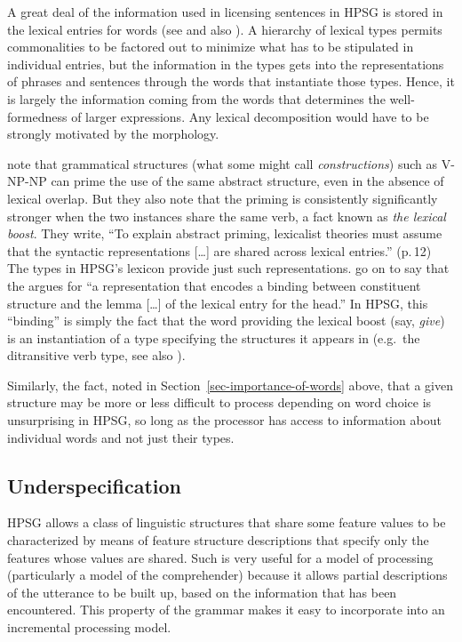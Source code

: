 \documentclass[output=paper,biblatex,babelshorthands,newtxmath,draftmode,colorlinks,citecolor=brown]{langscibook}
\begin{document}
\largerpage\enlargethispage{5pt}
A great deal of the information used in licensing sentences in HPSG is stored in
the lexical entries for words (see \citealp{MWArgSt} and also
).  A hierarchy of lexical
types permits commonalities to be factored out to minimize what has to be
stipulated in individual entries, but the information in the types gets into the representations of
phrases and sentences through the words that instantiate those types. Hence, it is largely the
information coming from the words that determines the well-formedness of larger expressions.  Any
lexical decomposition would have to be strongly motivated by the morphology.

\citet[Section~2.3]{BraniganPickering2017} note that grammatical structures (what some might call
\emph{constructions}) such as V-NP-NP can prime the use of the same abstract
structure, even in the absence of lexical overlap.  But they also note that the priming is
consistently significantly stronger when the two instances share the same verb, a fact known as
\emph{the lexical boost}.  They write, ``To explain abstract priming, lexicalist
theories must assume that the syntactic representations [\ldots] are shared across lexical
entries.'' (p.\,12) The types in HPSG's lexicon provide just such
representations. \citeauthor{BraniganPickering2017} go on to say that the  argues
for ``a representation that encodes a binding between constituent structure and the lemma [\ldots]
of the lexical entry for the head.''  In HPSG, this ``binding'' is simply the fact that the word
providing the lexical boost (say, \emph{give}) is an instantiation of a type specifying the
structures it appears in (e.g.\ the ditransitive verb type, see also \citealp*{YKD2019a-u}).

Similarly, the fact, noted in Section~\ref{sec-importance-of-words} above, that a given structure
may be more or less difficult to process depending on word choice is unsurprising in HPSG, so long
as the processor has access to information about individual words and not just their types.    

\subsection{Underspecification}

HPSG allows a class of linguistic structures that share some feature values to be characterized by
means of feature structure descriptions that specify only the features whose values are shared.
Such  is very useful for a model of processing (particularly a model of the
comprehender) because it allows partial descriptions of the utterance to be built up, based on the
information that has been encountered.  This property of the grammar makes it easy to incorporate
into an incremental processing model.
\end{document}
